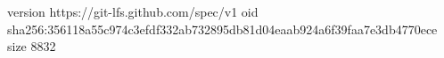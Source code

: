 version https://git-lfs.github.com/spec/v1
oid sha256:356118a55c974c3efdf332ab732895db81d04eaab924a6f39faa7e3db4770ece
size 8832
